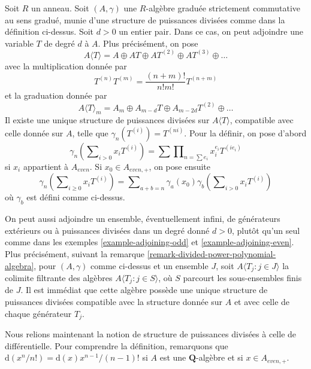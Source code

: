 \begin{example}
\label{example-adjoining-even}
Soit $R$ un anneau. Soit $(A, \gamma)$ une
$R$-algèbre graduée strictement commutative au sens gradué, munie d'une structure de puissances divisées
comme dans la définition ci-dessus. Soit $d > 0$ un entier pair.
Dans ce cas, on peut adjoindre une variable $T$ de degré $d$ à $A$.
Plus précisément, on pose
$$
A\langle T \rangle = A \oplus AT \oplus AT^{(2)} \oplus AT^{(3)} \oplus\ldots
$$
avec la multiplication donnée par
$$
T^{(n)} T^{(m)} = \frac{(n + m)!}{n!m!} T^{(n + m)}
$$
et la graduation donnée par
$$
A\langle T \rangle_m =
A_m \oplus A_{m - d}T \oplus A_{m - 2d}T^{(2)} \oplus\ldots
$$
Il existe une unique structure de puissances divisées sur
$A\langle T \rangle$, compatible avec celle
donnée sur $A$, telle que $\gamma_n(T^{(i)}) = T^{(ni)}$.
Pour la définir, on pose d'abord
$$
\gamma_n\left(\sum\nolimits_{i > 0} x_i T^{(i)}\right) =
\sum\prod\nolimits_{n = \sum e_i} x_i^{e_i} T^{(ie_i)}
$$
si $x_i$ appartient à $A_{even}$. Si $x_0 \in A_{even, +}$,
on pose ensuite
$$
\gamma_n\left(\sum\nolimits_{i \geq 0} x_i T^{(i)}\right) =
\sum\nolimits_{a + b = n}
\gamma_a(x_0)\gamma_b\left(\sum\nolimits_{i > 0} x_iT^{(i)}\right)
$$
où $\gamma_b$ est défini comme ci-dessus.
\end{example}

\begin{remark}
\label{remark-adjoining-set-of-variables} On
peut aussi adjoindre un ensemble, éventuellement infini, de générateurs extérieurs ou
à puissances divisées dans un degré donné $d > 0$, plutôt qu'un seul comme
dans les exemples \ref{example-adjoining-odd}
et \ref{example-adjoining-even}. Plus
précisément, suivant la remarque \ref{remark-divided-power-polynomial-algebra},
pour $(A,\gamma)$
comme ci-dessus et un ensemble $J$, soit $A\langle
T_j:j\in J\rangle$ la colimite filtrante des algèbres
$A\langle T_j:j\in S\rangle$, où $S$
parcourt les sous-ensembles finis de $J$. Il est immédiat que cette algèbre possède une unique structure de
puissances divisées compatible avec la structure donnée sur $A$ et avec
celle de chaque générateur $T_j$.
\end{remark}

\noindent
Nous relions maintenant la notion de structure de puissances divisées à
celle de différentielle. Pour comprendre la définition, remarquons que
$\text{d}(x^n/n!) = \text{d}(x) x^{n - 1}/(n - 1)!$ si $A$
est une $\mathbf{Q}$-algèbre et si $x \in A_{even, +}$.

